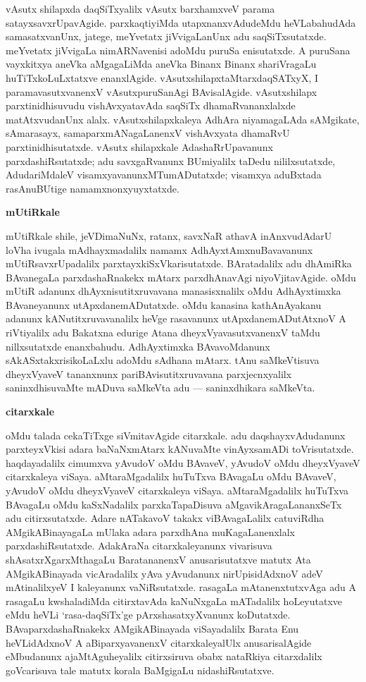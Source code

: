 vAsutx shilapxda daqSiTxyalilx vAsutx barxhamxveV parama satayxsavxrUpavAgide. parxkaqtiyiMda utapxnanxvAdudeMdu heVLabahudAda samasatxvanUnx, jatege, meYvetatx jiVvigaLanUnx adu saqSiTxsutatxde. meYvetatx jiVvigaLa nimARNavenisi adoMdu puruSa enisutatxde. A puruSana vayxkitxya aneVka aMgagaLiMda aneVka Binanx Binanx shariVragaLu huTiTxkoLuLxtatxve enanxlAgide. vAsutxshilapxtaMtarxdaqSATxyX, I paramavasutxvanenxV vAsutxpuruSanAgi BAvisalAgide. vAsutxshilapx parxtinidhisuvudu vishAvxyatavAda saqSiTx dhamaRvananxlalxde matAtxvudanUnx alalx. vAsutxshilapxkaleya AdhAra niyamagaLAda sAMgikate, sAmarasayx, samaparxmANagaLanenxV vishAvxyata dhamaRvU parxtinidhisutatxde. vAsutx shilapxkale AdashaRrUpavanunx parxdashiRsutatxde; adu savxgaRvanunx BUmiyalilx taDedu nililxsutatxde, AdudariMdaleV visamxyavanunxMTumADutatxde; visamxya aduBxtada rasAnuBUtige namamxnonxyuyxtatxde.

\bigskip
\begin{center}
{\Large\bf mUtiRkale}
\end{center}

mUtiRkale shile, jeVDimaNuNx, ratanx, savxNaR athavA inAnxvudAdarU loVha ivugala mAdhayxmadalilx namamx AdhAyxtAmxnuBavavanunx mUtiRsavxrUpadalilx parxtayxkiSxVkarisutatxde. BAratadalilx adu dhAmiRka BAvanegaLa parxdashaRnakekx mAtarx parxdhAnavAgi niyoVjitavAgide. oMdu mUtiR adanunx dhAyxnisutitxruvavana manasisxnalilx oMdu AdhAyxtimxka BAvaneyanunx utApxdanemADutatxde. oMdu kanasina kathAnAyakanu adanunx kANutitxruvavanalilx heVge rasavanunx utApxdanemADutAtxnoV A riVtiyalilx adu Bakatxna edurige Atana dheyxVyavasutxvanenxV taMdu nillxsutatxde enanxbahudu. AdhAyxtimxka BAvavoMdanunx sAkASxtakxrisikoLaLxlu adoMdu sAdhana mAtarx. tAnu saMkeVtisuva dheyxVyaveV tananxnunx pariBAvisutitxruvavana parxjecnxyalilx saninxdhisuvaMte mADuva saMkeVta adu --- saninxdhikara saMkeVta.

\bigskip
\begin{center}
{\Large\bf citarxkale}
\end{center}

oMdu talada cekaTiTxge siVmitavAgide citarxkale. adu daqshayxvAdudanunx parxteyxVkisi adara baNaNxmAtarx kANuvaMte vinAyxsamADi toVrisutatxde. haqdayadalilx cimumxva yAvudoV oMdu BAvaveV, yAvudoV oMdu dheyxVyaveV citarxkaleya viSaya. aMtaraMgadalilx huTuTxva BAvagaLu oMdu BAvaveV, yAvudoV oMdu dheyxVyaveV citarxkaleya viSaya. aMtaraMgadalilx huTuTxva BAvagaLu oMdu kaSxNadalilx parxkaTapaDisuva aMgavikAragaLananxSeTx adu citirxsutatxde. Adare nATakavoV takakx viBAvagaLalilx catuviRdha AMgikABinayagaLa mUlaka adara parxdhAna muKagaLanenxlalx parxdashiRsutatxde. AdakAraNa citarxkaleyanunx vivarisuva shAsatxrXgarxMthagaLu BaratananenxV anusarisutatxve matutx Ata AMgikABinayada vicAradalilx yAva yAvudanunx nirUpisidAdxnoV adeV mAtinalilxyeV I kaleyanunx vaNiRsutatxde. rasagaLa mAtanenxtutxvAga adu A rasagaLu kwshaladiMda citirxtavAda kaNuNxgaLa mATadalilx hoLeyutatxve eMdu heVLi `rasa-daqSiTx'ge pArxshasatxyXvanunx koDutatxde. BAvaparxdashaRnakekx AMgikABinayada viSayadalilx Barata Enu heVLidAdxnoV A aBiparxyavanenxV citarxkaleyalUlx anusarisalAgide eMbudanunx ajaMtAguheyalilx citirxsiruva obabx nataRkiya citarxdalilx goVcarisuva tale matutx korala BaMgigaLu nidashiRsutatxve.

